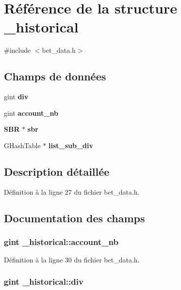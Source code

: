\section{Référence de la structure \_\-historical}
\label{struct__historical}


{\ttfamily \#include $<$bet\_\-data.h$>$}

\subsection*{Champs de données}
\begin{DoxyCompactItemize}
\item 
gint {\bf div}
\item 
gint {\bf account\_\-nb}
\item 
{\bf SBR} $\ast$ {\bf sbr}
\item 
GHashTable $\ast$ {\bf list\_\-sub\_\-div}
\end{DoxyCompactItemize}


\subsection{Description détaillée}


Définition à la ligne 27 du fichier bet\_\-data.h.



\subsection{Documentation des champs}
\subsubsection[{account\_\-nb}]{\setlength{\rightskip}{0pt plus 5cm}gint {\bf \_\-historical::account\_\-nb}}\label{struct__historical_a0b07d8036f659e40b7a8dca254977f38}


Définition à la ligne 30 du fichier bet\_\-data.h.

\subsubsection[{div}]{\setlength{\rightskip}{0pt plus 5cm}gint {\bf \_\-historical::div}}\label{struct__historical_af538d684e0e04e0b0a6748ea693511da}


